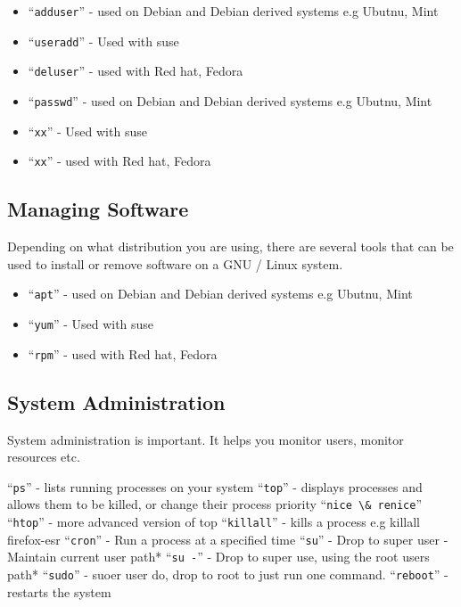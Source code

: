 \documentclass{extbook}
\begin{document}
\begin{itemize}
\item ``\verb|adduser|'' - used on Debian and Debian derived systems e.g Ubutnu, Mint
\item ``\verb|useradd|'' - Used with suse 
\item ``\verb|deluser|'' - used with Red hat, Fedora 
\item ``\verb|passwd|'' - used on Debian and Debian derived systems e.g Ubutnu, Mint
\item ``\verb|xx|'' - Used with suse 
\item ``\verb|xx|'' - used with Red hat, Fedora 
\end{itemize}


\subsection{Managing Software}

Depending on what distribution you are using, there are several tools that can be used to install or remove software on a GNU / Linux system.  

\begin{itemize}
\item ``\verb|apt|'' - used on Debian and Debian derived systems e.g Ubutnu, Mint
\item ``\verb|yum|'' - Used with suse 
\item ``\verb|rpm|'' - used with Red hat, Fedora 
\end{itemize}

\subsection{System Administration}

System administration is important.  It helps you monitor users, monitor resources etc.
\begin{itemize}
``\verb|ps|'' - lists running processes on your system
``\verb|top|'' - displays processes and allows them to be killed, or change their process priority
``\verb|nice \& renice|''
``\verb|htop|'' - more advanced version of top
``\verb|killall|'' - kills a process e.g killall firefox-esr
``\verb|cron|'' - Run a process at a specified time
``\verb|su|'' - Drop to super user - Maintain current user path*
``\verb|su -|'' - Drop to super use,  using the root users path* 
``\verb|sudo|'' - suoer user do,  drop to root to just run one command.
``\verb|reboot|'' - restarts the system
\end{itemize}
\end{document}
